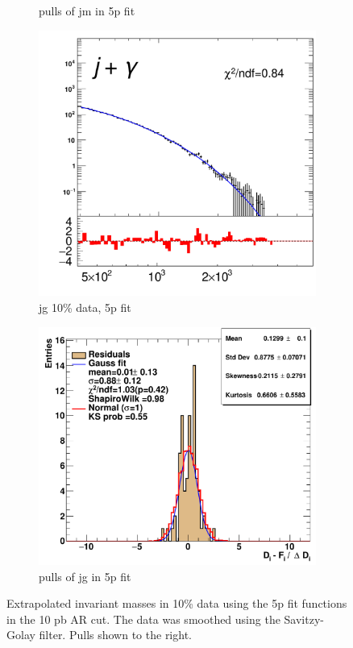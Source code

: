 \begin{figure}[H]
\begin{subfigure}[h]{0.4\linewidth}
    \caption{pulls of jm in 5p fit}
    \end{subfigure}
    \hfill
    \begin{subfigure}[h]{0.38\linewidth}
    \includegraphics[scale=0.3]{figs//app/10data/pub_mass_10per_extrapolate_jg.pdf}%
    \caption{jg 10\% data, 5p fit}
    \end{subfigure}
    \hfill
    \begin{subfigure}[h]{0.4\linewidth}
    \includegraphics[scale=0.32]{figs/app/10data/pub_mass_10per_extrapolate_residuals_jg.pdf}%
    \caption{pulls of jg in 5p fit}
    \end{subfigure}
    \hfill
    \caption{Extrapolated invariant masses in 10\% data using the 5p fit functions in the 10 pb AR cut. The data was smoothed using the Savitzy-Golay filter. Pulls shown to the right.}
\label{fig:10data-fit-pulls-je}
\end{figure}
\newpage

